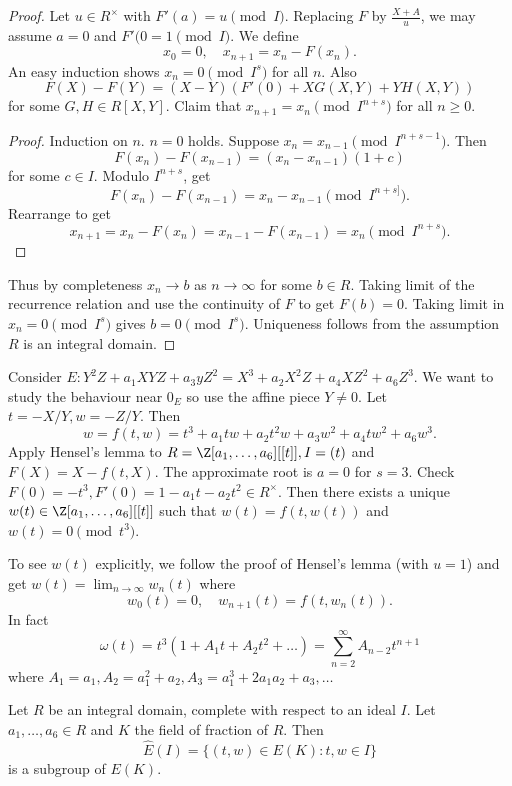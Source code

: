 \documentclass[a4paper]{article}
\theoremstyle{definition}
\begin{document}
\begin{proof}
  Let \(u \in R^\times\) with \(F'(a) = u \pmod I\). Replacing \(F\) by \(\frac{X + A}{u}\), we may assume \(a = 0\) and \(F'(0 = 1 \pmod I\). We define
  \[
    x_0 = 0, \quad x_{n + 1} = x_n - F(x_n).
  \]
  An easy induction shows \(x_n = 0 \pmod{I^s}\) for all \(n\). Also
  \[
    F(X) - F(Y) = (X - Y) (F'(0) + X G(X, Y) + Y H(X, Y))
  \]
  for some \(G, H \in R[X, Y]\). Claim that \(x_{n + 1} = x_n \pmod{I^{n + s}}\) for all \(n \geq 0\).

  \begin{proof}
    Induction on \(n\). \(n = 0\) holds. Suppose \(x_n = x_{n - 1} \pmod{I^{n + s - 1}}\). Then
    \[
      F(x_n) - F(x_{n - 1}) = (x_n - x_{n - 1})(1 + c)
    \]
    for some \(c \in I\). Modulo \(I^{n + s}\), get
    \[
      F(x_n) - F(x_{n - 1}) = x_n - x_{n - 1} \pmod{I^{n + s]}}.
    \]
    Rearrange to get
    \[
      x_{n + 1} = x_n - F(x_n) = x_{n - 1} - F(x_{n - 1}) = x_n \pmod{I^{n + s}}.
    \]
  \end{proof}
  Thus by completeness \(x_n \to b\) as \(n \to \infty\) for some \(b \in R\). Taking limit of the recurrence relation and use the continuity of \(F\) to get \(F(b) = 0\). Taking limit in \(x_n = 0 \pmod{I^s}\) gives \(b = 0 \pmod{I^s}\). Uniqueness follows from the assumption \(R\) is an integral domain.
\end{proof}

Consider \(E: Y^2Z + a_1 XYZ + a_3 yZ^2 = X^3 + a_2X^2Z + a_4XZ^2 + a_6Z^3\). We want to study the behaviour near \(0_E\) so use the affine piece \(Y \neq 0\). Let \(t = -X/Y, w = -Z/Y\). Then
\[
  w = f(t, w) = t^3 + a_1tw + a_2t^2w + a_3w^2 + a_4tw^2 + a_6w^3.
\]
Apply Hensel's lemma to \(R = \Z[a_1, \dots, a_6][[t]], I = (t)\) and \(F(X) = X - f(t, X)\). The approximate root is \(a = 0\) for \(s = 3\). Check \(F(0) = -t^3, F'(0) = 1 - a_1t - a_2t^2 \in R^\times\). Then there exists a unique \(w(t) \in \Z[a_1, \dots, a_6][[t]]\) such that \(w(t) = f(t, w(t))\) and \(w(t) = 0 \pmod{t^3}\).

To see \(w(t)\) explicitly, we follow the proof of Hensel's lemma (with \(u = 1\)) and get \(w(t) = \lim_{n \to \infty} w_n(t)\) where
\[
  w_0(t) = 0, \quad w_{n + 1}(t) = f(t, w_n(t)).
\]
In fact
\[
  \omega(t) = t^3 (1 + A_1t + A_2t^2 + \dots) = \sum_{n = 2}^\infty A_{n - 2}t^{n + 1}
\]
where \(A_1 = a_1, A_2 = a_1^2 + a_2, A_3 = a_1^3 + 2a_1a_2 + a_3, \dots\)

\begin{lemma}
  Let \(R\) be an integral domain, complete with respect to an ideal \(I\). Let \(a_1, \dots, a_6 \in R\) and \(K\) the field of fraction of \(R\). Then
  \[
    \hat E(I) = \{(t, w) \in E(K): t, w \in I\}
  \]
  is a subgroup of \(E(K)\).
\end{lemma}
\end{document}
